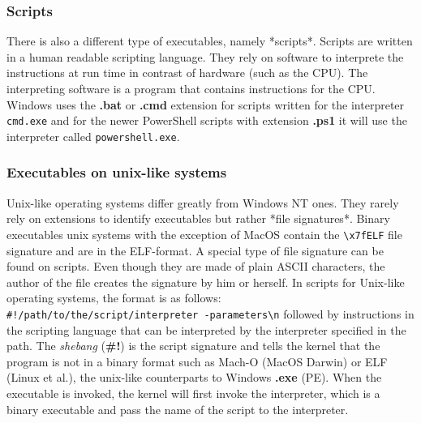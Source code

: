 \subsubsection{Scripts}

There is also a different type of executables, namely *scripts*. Scripts are written in a human readable
scripting language. They rely on software to interprete the instructions at run time in contrast of
hardware (such as the CPU). The interpreting software is a program that contains instructions for
the CPU. Windows uses the \textbf{.bat} or \textbf{.cmd} extension for scripts written for the interpreter \texttt{cmd.exe} and for
the newer PowerShell scripts with extension \textbf{.ps1} it will use the interpreter called \texttt{powershell.exe}.


\subsubsection{Executables on unix-like systems}

Unix-like operating systems differ greatly from Windows NT ones. They rarely rely on extensions to
identify executables but rather *file signatures*. Binary executables unix systems with the exception of MacOS
contain the \texttt{\textbackslash x7fELF} file signature and are in the ELF-format. A special type of file signature can be found on
scripts. Even though they are made of plain ASCII characters, the author of the file creates the
signature by him or herself. In scripts for Unix-like operating systems, the format is as follows: \\
\texttt{\#!/path/to/the/script/interpreter -parameters\textbackslash n} followed by instructions in the scripting language that can
be interpreted by the interpreter specified in the path. The \textit{shebang} (\textbf{\#!}) is the script signature
and tells the kernel that the program is not in a binary format such as Mach-O (MacOS Darwin) or ELF (Linux et al.),
the unix-like counterparts to Windows \textbf{.exe} (PE). When the executable is invoked,
the kernel will first invoke the interpreter, which is a binary executable and pass the name of the script
to the interpreter.



















